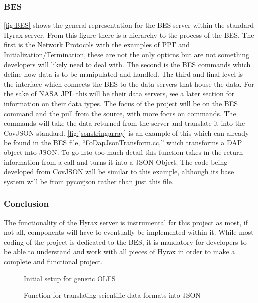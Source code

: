 \documentclass[onecolumn, draftclsnofoot,10pt, compsoc]{IEEEtran}
\begin{document}
\subsubsection{BES}
\autoref{fig:BES} shows the general representation for the BES server within the standard Hyrax server. \cite{HyraxArchitecture} From this figure there is a hierarchy to the process of the BES. The first is the Network Protocols with the examples of PPT and Initialization/Termination, these are not the only options but are not something developers will likely need to deal with. The second is the BES commands which define how data is to be manipulated and handled. The third and final level is the interface which connects the BES to the data servers that house the data. For the sake of NASA JPL this will be their data servers, see a later section for information on their data types. The focus of the project will be on the BES command and the pull from the source, with more focus on commands. The commands will take the data returned from the server and translate it into the CovJSON standard. \autoref{fig:jsonstringarray} is an example of this which can already be found in the BES file, “FoDapJsonTransform.cc,” which transforms a DAP object into JSON. \cite{FoDapJsonTransform}
To go into too much detail this function takes in the return information from a call and turns it into a JSON Object. The code being developed from CovJSON will be similar to this example, although its base system will be from pycovjson rather than just this file. 
\subsubsection{Conclusion}
The functionality of the Hyrax server is instrumental for this project as most, if not all, components will have to eventually be implemented within it. While most coding of the project is dedicated to the BES, it is mandatory for developers to be able to understand and work with all pieces of Hyrax in order to make a complete and functional project.
\begin{figure}[H]
    \centering
    
    \caption{Initial setup for generic OLFS}
    \label{fig:OLFS}
\end{figure}

\begin{figure}[H]
    \caption{Function for translating scientific data formats into JSON}
    \label{fig:jsonstringarray}
\end{figure}
\end{document}
